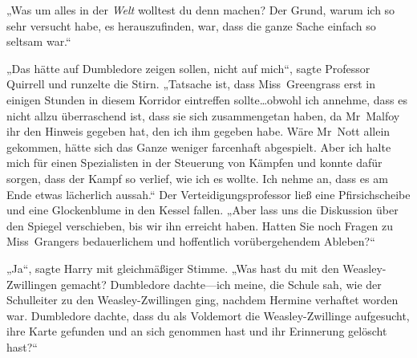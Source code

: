 „Was um alles in der \emph{Welt} wolltest du denn machen? Der Grund, warum ich so sehr versucht habe, es herauszufinden, war, dass die ganze Sache einfach so seltsam war.“

„Das hätte auf Dumbledore zeigen sollen, nicht auf mich“, sagte Professor Quirrell und runzelte die Stirn.
„Tatsache ist, dass Miss~Greengrass erst in einigen Stunden in diesem Korridor eintreffen sollte…obwohl ich annehme, dass es nicht allzu überraschend ist, dass sie sich zusammengetan haben, da Mr~Malfoy ihr den Hinweis gegeben hat, den ich ihm gegeben habe. Wäre Mr~Nott allein gekommen, hätte sich das Ganze weniger farcenhaft abgespielt. Aber ich halte mich für einen Spezialisten in der Steuerung von Kämpfen und konnte dafür sorgen, dass der Kampf so verlief, wie ich es wollte. Ich nehme an, dass es am Ende etwas lächerlich aussah.“
Der Verteidigungsprofessor ließ eine Pfirsichscheibe und eine Glockenblume in den Kessel fallen.
„Aber lass uns die Diskussion über den Spiegel verschieben, bis wir ihn erreicht haben. Hatten Sie noch Fragen zu Miss~Grangers bedauerlichem und hoffentlich vorübergehendem Ableben?“

„Ja“, sagte Harry mit gleichmäßiger Stimme. „Was hast du mit den Weasley-Zwillingen gemacht? Dumbledore dachte—ich meine, die Schule sah, wie der Schulleiter zu den Weasley-Zwillingen ging, nachdem Hermine verhaftet worden war. Dumbledore dachte, dass du als Voldemort die Weasley-Zwillinge aufgesucht, ihre Karte gefunden und an sich genommen hast und ihr Erinnerung gelöscht hast?“


